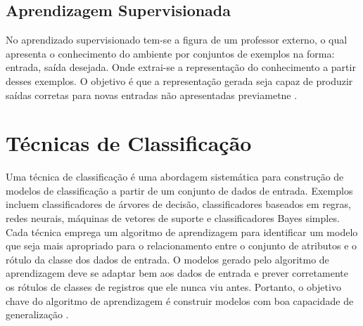 \documentclass[
	12pt,				%
	openright,			%
	oneside,	
	a4paper,				%
	english,				%
	brazil				%
]{abntex2/abntex2} %
\begin{document}
	\subsection{Aprendizagem Supervisionada}
	
	No aprendizado supervisionado tem-se a figura de um professor externo, o qual apresenta o conhecimento do ambiente por conjuntos de exemplos na forma: entrada, saída desejada. Onde extrai-se a representação do conhecimento a partir desses exemplos. O objetivo é que a representação gerada seja capaz de produzir saídas corretas para novas entradas não apresentadas previametne \cite{lorena:2007}.
	
	\section{Técnicas de Classificação}
	
	Uma técnica de classificação é uma abordagem sistemática para construção de modelos de classificação a partir de um conjunto de dados de entrada. Exemplos incluem classificadores de árvores de decisão, classificadores baseados em regras, redes neurais, máquinas de vetores de suporte e classificadores Bayes simples. Cada técnica emprega um algoritmo de aprendizagem para identificar um modelo que seja mais apropriado para o relacionamento entre o conjunto de atributos e o rótulo da classe dos dados de entrada. O modelos gerado pelo algoritmo de aprendizagem deve se adaptar bem aos dados de entrada e prever corretamente os rótulos de classes de registros que ele nunca viu antes. Portanto, o objetivo chave do algoritmo de aprendizagem é construir modelos com boa capacidade de generalização \cite{tan:2009}.
	
\end{document}
